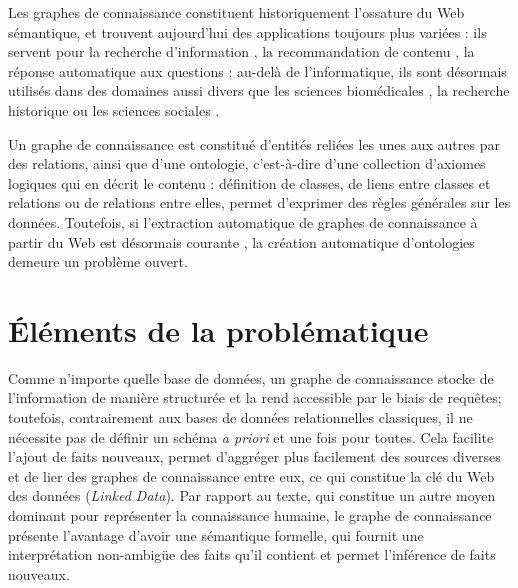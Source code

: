 \label{sec:Introduction}  %

Les graphes de connaissance constituent historiquement l'ossature du Web sémantique, et trouvent aujourd'hui des applications toujours plus variées : ils servent pour la recherche d'information \cite{bounhas2019building, dietz2018utilizing}, la recommandation de contenu \cite{ying2018graph, wang2018ripplenet, wang2019explainable}, la réponse automatique aux questions \cite{zhang2018variational, lukovnikov2017neural, saha2018complex};%
au-delà de l'informatique, ils sont désormais utilisés dans des domaines aussi divers que les sciences biomédicales \cite{bakal2018exploiting, sousa2020evolving}, la recherche historique \cite{hyvonen2019knowledge, wilcke2017user} ou les sciences sociales \cite{heling2019building}.

%
Un graphe de connaissance est constitué d'entités reliées les unes aux autres par des relations, ainsi que d'une ontologie, c'est-à-dire d'une collection d'axiomes logiques qui en décrit le contenu : définition de classes, de liens entre classes et relations ou de relations entre elles, 
permet d'exprimer des règles générales sur les données.
Toutefois, si l'extraction automatique de graphes de connaissance à partir du Web est désormais courante \cite{auer2007dbpedia}, la création automatique d'ontologies demeure un problème ouvert.


\section{Éléments de la problématique}  %

Comme n'importe quelle base de données, un graphe de connaissance stocke de l'information de manière structurée et la rend accessible par le biais de requêtes; toutefois, contrairement aux bases de données relationnelles classiques, il ne nécessite pas de définir un schéma \textit{a priori} et une fois pour toutes. Cela facilite l'ajout de faits nouveaux, permet d'aggréger plus facilement des sources diverses et de lier des graphes de connaissance entre eux, ce qui constitue la clé du Web des données (\textit{Linked Data}).
Par rapport au texte, qui constitue un autre moyen dominant pour représenter la connaissance humaine, le graphe de connaissance présente l'avantage d'avoir une sémantique formelle, qui fournit une interprétation non-ambigüe des faits qu'il contient et permet l'inférence de faits nouveaux.

